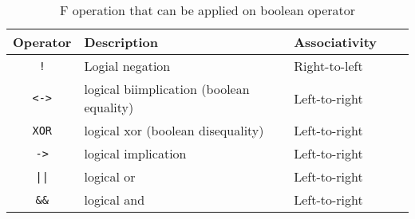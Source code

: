 \begin{table}[h]
\centering

\begin{tabular}{|c|l|l|l|l|}
\hline
\textbf{Operator} & \textbf{Description} & \textbf{Associativity} \\ 
\hline
\verb|!|	& Logial negation	& Right-to-left	\\
\verb|<->| & logical biimplication (boolean equality) & Left-to-right \\ 
\verb|XOR| & logical xor (boolean disequality) & Left-to-right \\ 
\verb|->|  & logical implication & Left-to-right \\ 
\verb!||!  & logical or & Left-to-right\\ 
\verb|&&|	& logical and & Left-to-right\\ 
\hline
\end{tabular}
\caption{F operation that can be applied on boolean operator}
\label{table:f:bool:operators}
\end{table}


